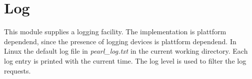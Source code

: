 \section{Log}
This module supplies a logging facility. The implementation is
plattform dependend, since the presence of logging devices is
plattform dependend.
In Linux the default log file in {\em pearl\_log.txt} in the current working
directory.
Each log entry is printed with the current time.
The log level is used to filter the log requests.
